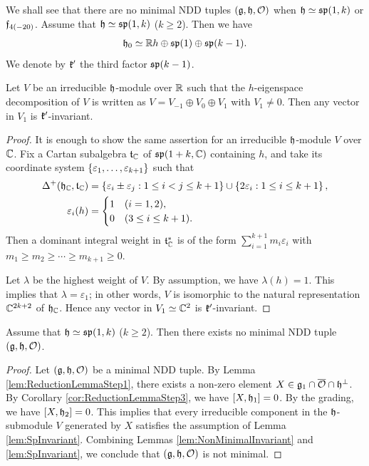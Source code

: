 We shall see that there are no minimal NDD tuples $(\mathfrak{g}, \mathfrak{h}, \mathcal{O})$ when $\mathfrak{h} \simeq \mathfrak{sp}(1, k)$ or $\mathfrak{f}_{4(-20)}$.
Assume that $\mathfrak{h} \simeq \mathfrak{sp}(1, k)$ ($k \geq 2$).
Then we have
\begin{align*}
	\mathfrak{h}_0 \simeq \mathbb{R} h \oplus \mathfrak{sp}(1) \oplus \mathfrak{sp}(k-1).
\end{align*}
We denote by $\mathfrak{k}'$ the third factor $\mathfrak{sp}(k-1)$.

\begin{lemma} \label{lem:SpInvariant}
	Let $V$ be an irreducible $\mathfrak{h}$-module over $\mathbb{R}$ such that the $h$-eigenspace decomposition of $V$ is written as $V = V_{-1} \oplus V_0 \oplus V_1$ with $V_1 \neq 0$.
	Then any vector in $V_1$ is $\mathfrak{k}'$-invariant.
\end{lemma}

\begin{proof}
	It is enough to show the same assertion for an irreducible $\mathfrak{h}$-module $V$ over $\mathbb{C}$.
	Fix a Cartan subalgebra $\mathfrak{t}_{\mathbb{C}}$ of $\mathfrak{sp}(1+k, \mathbb{C})$ containing $h$, and take its coordinate system $\left\{\varepsilon_1, \ldots, \varepsilon_{k+1} \right\}$ such that
	\begin{align*}
		\Delta^+(\mathfrak{h}_{\mathbb{C}}, \mathfrak{t}_{\mathbb{C}}) &= \left\{\varepsilon_i \pm \varepsilon_j : 1\leq i < j \leq k+1 \right\} \cup \left\{2\varepsilon_i : 1 \leq i \leq k+1 \right\},\\
		\varepsilon_i(h) &= \begin{cases}
			1 & (i = 1,2), \\
			0 & (3 \leq i \leq k+1).
		\end{cases}
	\end{align*}
	Then a dominant integral weight in $\mathfrak{t}_{\mathbb{C}}^*$ is of the form $\sum_{i=1}^{k+1} m_i \varepsilon_i$ with $m_1 \geq m_2 \geq \cdots \geq m_{k+1} \geq 0$.

	Let $\lambda$ be the highest weight of $V$.
	By assumption, we have $\lambda(h) = 1$.
	This implies that $\lambda = \varepsilon_1$; in other words, $V$ is isomorphic to the natural representation $\mathbb{C}^{2k+2}$ of $\mathfrak{h}_{\mathbb{C}}$.
	Hence any vector in $V_1 \simeq \mathbb{C}^2$ is $\mathfrak{k}'$-invariant.
\end{proof}

\begin{theorem} \label{thm:NonMinimalSp}
	Assume that $\mathfrak{h} \simeq \mathfrak{sp}(1, k)$ ($k \geq 2$).
	Then there exists no minimal NDD tuple $(\mathfrak{g}, \mathfrak{h}, \mathcal{O})$.
\end{theorem}

\begin{proof}
	Let $(\mathfrak{g}, \mathfrak{h}, \mathcal{O})$ be a minimal NDD tuple.
	By Lemma \ref{lem:ReductionLemmaStep1}, there exists a non-zero element $X \in \mathfrak{g}_1 \cap \overline{\mathcal{O}} \cap \mathfrak{h}^\perp$.
	By Corollary \ref{cor:ReductionLemmaStep3}, we have $[X, \mathfrak{h}_1] = 0$.
	By the grading, we have $[X, \mathfrak{h}_2] = 0$.
	This implies that every irreducible component in the $\mathfrak{h}$-submodule $V$ generated by $X$ satisfies the assumption of Lemma \ref{lem:SpInvariant}.
	Combining Lemmas \ref{lem:NonMinimalInvariant} and \ref{lem:SpInvariant}, we conclude that $(\mathfrak{g}, \mathfrak{h}, \mathcal{O})$ is not minimal.
\end{proof}

